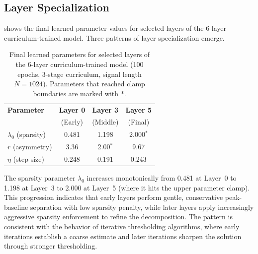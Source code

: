 \subsection{Layer Specialization}
\label{sec:results_layer_spec}

 shows the final learned parameter values for selected layers of the 6-layer curriculum-trained model. Three patterns of layer specialization emerge.

\begin{table}[t]
    \centering
    \caption{Final learned parameters for selected layers of the 6-layer curriculum-trained model (100 epochs, 3-stage curriculum, signal length $N = 1024$). Parameters that reached clamp boundaries are marked with $\ast$.}
    \label{tab:learned_params}
    \begin{tabular}{@{}lccc@{}}
        \toprule
        \textbf{Parameter} & \textbf{Layer 0} & \textbf{Layer 3} & \textbf{Layer 5} \\
         & (Early) & (Middle) & (Final) \\
        \midrule
        $\lambda_0$ (sparsity) & 0.481 & 1.198 & 2.000$^\ast$ \\
        $r$ (asymmetry) & 3.36 & 2.00$^\ast$ & 9.67 \\
        $\eta$ (step size) & 0.248 & 0.191 & 0.243 \\
        \bottomrule
    \end{tabular}
\end{table}


The sparsity parameter $\lambda_0$ increases monotonically from 0.481 at Layer~0 to 1.198 at Layer~3 to 2.000 at Layer~5 (where it hits the upper parameter clamp). This progression indicates that early layers perform gentle, conservative peak-baseline separation with low sparsity penalty, while later layers apply increasingly aggressive sparsity enforcement to refine the decomposition. The pattern is consistent with the behavior of iterative thresholding algorithms, where early iterations establish a coarse estimate and later iterations sharpen the solution through stronger thresholding.

